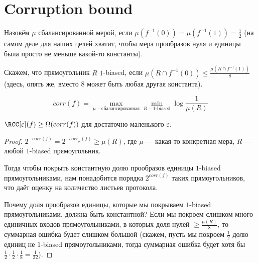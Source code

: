 \section{Corruption bound}

Назовём $\mu$ сбалансированной мерой, если $\mu(f^{-1}(0)) = \mu(f^{-1}(1)) = \frac{1}{2}$ (на самом деле
для наших целей хватит, чтобы мера прообразов нуля и единицы была просто не меньше какой-то константы).

Скажем, что прямоугольник $R$ $1$-biased, если $\mu(R \cap f^{-1}(0)) \leq \frac{\mu(R \cap
    f^{-1}(1))}{8}$ (здесь, опять же, вместо $8$ может быть любая другая константа).

$$corr(f) = \max_{\mu \text{~-- сбалансированная}} \min_{R \text{~-- 1-biased}} \log{\frac{1}{\mu(R)}}$$

\begin{lemma}
    $\RCC[\varepsilon](f) \ge \Omega(corr(f))$ для достаточно маленького $\varepsilon$.
\end{lemma}

\begin{proof}
    $2^{-corr(f)} = 2^{-corr_{\mu}(f)} \geq \mu(R)$, где $\mu$ --- какая-то конкретная мера, $R$ ---
    любой $1$-biased прямоугольник.

    Тогда чтобы покрыть константную долю прообразов единицы $1$-biased прямоугольниками, нам понадобится
    порядка $2^{corr(f)}$ таких прямоугольников, что даёт оценку на количество листьев протокола.

    Почему доля прообразов единицы, которые мы покрываем $1$-biased прямоугольниками, должна быть
    константной? Если мы покроем слишком много единичных входов прямоугольниками, в которых доля нулей
    $\geq \frac{\mu(R)}{8}$, то суммарная ошибка будет слишком большой (скажем, пусть мы покроем
    $\frac{1}{2}$ долю единиц не $1$-biased прямоугольниками, тогда суммарная ошибка будет хотя бы
    $\frac{1}{2} \cdot \frac{1}{2} \cdot \frac{1}{8} = \frac{1}{32}$). 
\end{proof}
